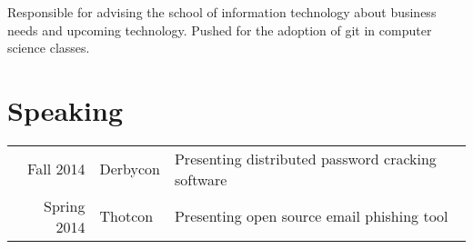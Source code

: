 \documentclass[letterpaper]{deedy-resume} %
\begin{document}
\begin{minipage}[t]{0.66\textwidth}
\sectionspace %



Responsible for advising the school of information technology about business needs and upcoming technology.  Pushed for the adoption of git in computer science classes. 

\sectionspace %



\section{Speaking} 

\begin{tabular}{rll}
Fall 2014 & Derbycon & Presenting distributed password cracking software\\
Spring 2014 & Thotcon & Presenting open source email phishing tool\\
\end{tabular}

\sectionspace %



\end{minipage} %
\hfill
%
%
\end{document}

